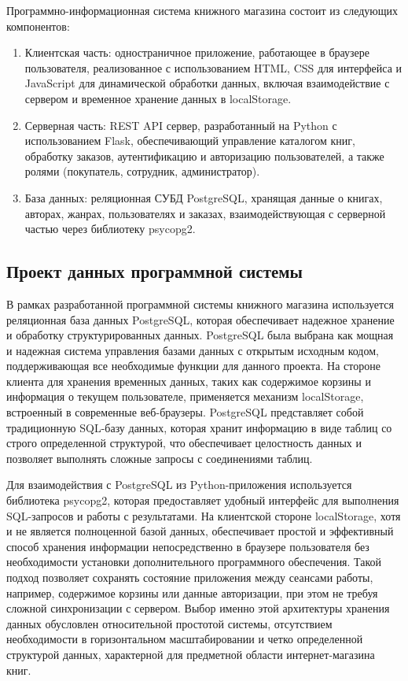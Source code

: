Программно-информационная система книжного магазина состоит из следующих компонентов:

\begin{enumerate}
	\item Клиентская часть: одностраничное приложение, работающее в браузере пользователя, реализованное с использованием HTML, CSS для интерфейса и JavaScript для динамической обработки данных, включая взаимодействие с сервером и временное хранение данных в localStorage. 
	\item Серверная часть: REST API сервер, разработанный на Python с использованием Flask, обеспечивающий управление каталогом книг, обработку заказов, аутентификацию и авторизацию пользователей, а также ролями (покупатель, сотрудник, администратор).
	\item База данных: реляционная СУБД PostgreSQL, хранящая данные о книгах, авторах, жанрах, пользователях и заказах, взаимодействующая с серверной частью через библиотеку psycopg2. 
\end{enumerate}

\subsection{Проект данных программной системы}

В рамках разработанной программной системы книжного магазина используется реляционная база данных PostgreSQL, которая обеспечивает надежное хранение и обработку структурированных данных. PostgreSQL была выбрана как мощная и надежная система управления базами данных с открытым исходным кодом, поддерживающая все необходимые функции для данного проекта. На стороне клиента для хранения временных данных, таких как содержимое корзины и информация о текущем пользователе, применяется механизм localStorage, встроенный в современные веб-браузеры. PostgreSQL представляет собой традиционную SQL-базу данных, которая хранит информацию в виде таблиц со строго определенной структурой, что обеспечивает целостность данных и позволяет выполнять сложные запросы с соединениями таблиц.

Для взаимодействия с PostgreSQL из Python-приложения используется библиотека psycopg2, которая предоставляет удобный интерфейс для выполнения SQL-запросов и работы с результатами. На клиентской стороне localStorage, хотя и не является полноценной базой данных, обеспечивает простой и эффективный способ хранения информации непосредственно в браузере пользователя без необходимости установки дополнительного программного обеспечения. Такой подход позволяет сохранять состояние приложения между сеансами работы, например, содержимое корзины или данные авторизации, при этом не требуя сложной синхронизации с сервером. Выбор именно этой архитектуры хранения данных обусловлен относительной простотой системы, отсутствием необходимости в горизонтальном масштабировании и четко определенной структурой данных, характерной для предметной области интернет-магазина книг.

